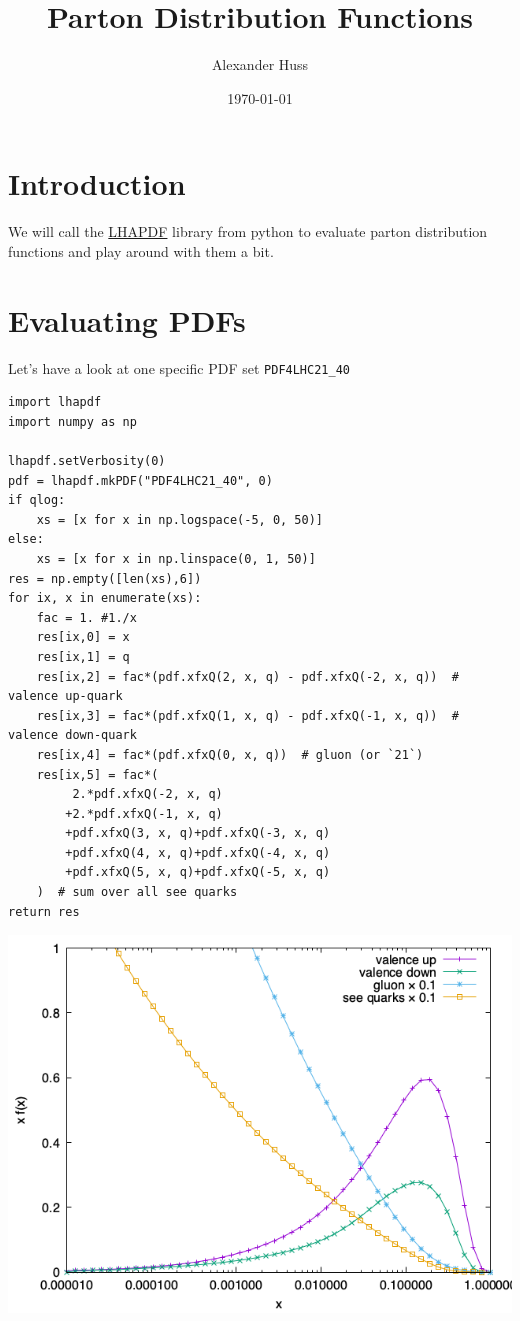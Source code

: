 \documentclass[11pt]{article}
\author{Alexander Huss}
\date{\today}
\title{Parton Distribution Functions}
\begin{document}
\maketitle
\tableofcontents



\section{Introduction}
\label{sec:orgb5a7dd4}
We will call the \href{https://lhapdf.hepforge.org/}{LHAPDF} library from python to evaluate parton distribution functions and play around with them a bit.

\section{Evaluating PDFs}
\label{sec:orga14e264}
Let's have a look at one specific PDF set \texttt{PDF4LHC21\_40}

\begin{verbatim}
import lhapdf
import numpy as np

lhapdf.setVerbosity(0)
pdf = lhapdf.mkPDF("PDF4LHC21_40", 0)
if qlog:
    xs = [x for x in np.logspace(-5, 0, 50)]
else:
    xs = [x for x in np.linspace(0, 1, 50)]
res = np.empty([len(xs),6])
for ix, x in enumerate(xs):
    fac = 1. #1./x
    res[ix,0] = x
    res[ix,1] = q
    res[ix,2] = fac*(pdf.xfxQ(2, x, q) - pdf.xfxQ(-2, x, q))  # valence up-quark
    res[ix,3] = fac*(pdf.xfxQ(1, x, q) - pdf.xfxQ(-1, x, q))  # valence down-quark
    res[ix,4] = fac*(pdf.xfxQ(0, x, q))  # gluon (or `21`)
    res[ix,5] = fac*(
         2.*pdf.xfxQ(-2, x, q)
        +2.*pdf.xfxQ(-1, x, q)
        +pdf.xfxQ(3, x, q)+pdf.xfxQ(-3, x, q)
        +pdf.xfxQ(4, x, q)+pdf.xfxQ(-4, x, q)
        +pdf.xfxQ(5, x, q)+pdf.xfxQ(-5, x, q)
    )  # sum over all see quarks
return res
\end{verbatim}

\begin{center}
\includegraphics[width=.9\linewidth]{pdf_xfx.png}
\end{center}
\end{document}
